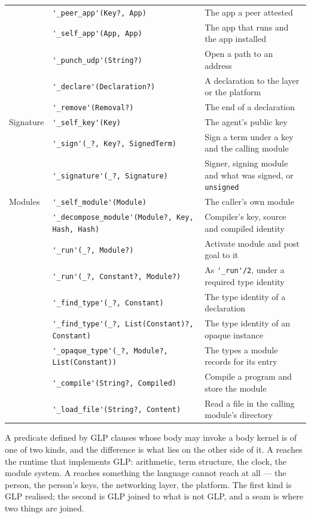 \begin{center}
{\begin{tabular}{@{}l@{\hspace{4pt}}l@{\hspace{4pt}}p{}@{}}
 & \verb|'_peer_app'(Key?, App)| & The app a peer attested \\
 & \verb|'_self_app'(App, App)| & The app that runs and the app installed \\
 & \verb|'_punch_udp'(String?)| & Open a path to an address \\
 & \verb|'_declare'(Declaration?)| & A declaration to the layer or the platform \\
 & \verb|'_remove'(Removal?)| & The end of a declaration \\
\hline
Signature & \verb|'_self_key'(Key)| & The agent's public key \\
 & \verb|'_sign'(_?, Key?, SignedTerm)| & Sign a term under a key and the calling module \\
 & \verb|'_signature'(_?, Signature)| & Signer, signing module and what was signed, or \verb|unsigned| \\
\hline
Modules & \verb|'_self_module'(Module)| & The caller's own module \\
 & \verb|'_decompose_module'(Module?, Key, Hash, Hash)| & Compiler's key, source and compiled identity \\
 & \verb|'_run'(_?, Module?)| & Activate module and post goal to it \\
 & \verb|'_run'(_?, Constant?, Module?)| & As \verb|'_run'/2|, under a required type identity \\
 & \verb|'_find_type'(_?, Constant)| & The type identity of a declaration \\
 & \verb|'_find_type'(_?, List(Constant)?, Constant)| & The type identity of an opaque instance \\
 & \verb|'_opaque_type'(_?, Module?, List(Constant))| & The types a module records for its entry \\
 & \verb|'_compile'(String?, Compiled)| & Compile a program and store the module \\
 & \verb|'_load_file'(String?, Content)| & Read a file in the calling module's directory \\
\end{tabular}
}
\end{center}

A predicate defined by GLP clauses whose body may invoke a body kernel is of one of two kinds, and the difference is what lies on the other side of it. A  reaches the runtime that implements GLP: arithmetic, term structure, the clock, the module system. A  reaches something the language cannot reach at all --- the person, the person's keys, the networking layer, the platform. The first kind is GLP realised; the second is GLP joined to what is not GLP, and a seam is where two things are joined.

